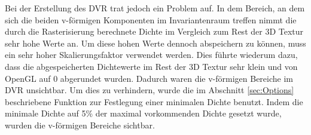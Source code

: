 \documentclass[a4paper,fontsize=12pt,toc=bib,halfparskip]{scrartcl}
\begin{document}
Bei der Erstellung des DVR trat jedoch ein Problem auf. In dem Bereich, an dem sich die beiden v-f\"ormigen Komponenten im Invariantenraum treffen nimmt die durch die Rasterisierung berechnete Dichte im Vergleich zum Rest der 3D Textur sehr hohe Werte an. Um diese hohen Werte dennoch abspeichern zu k\"onnen, muss ein sehr hoher Skalierungsfaktor verwendet werden. Dies f\"uhrte wiederum dazu, dass die abgespeicherten Dichtewerte im Rest der 3D Textur sehr klein und von OpenGL auf 0 abgerundet wurden. Dadurch waren die v-f\"ormigen Bereiche im DVR unsichtbar. Um dies zu verhindern, wurde die im Abschnitt \ref{sec:Options} beschriebene Funktion zur Festlegung einer minimalen Dichte benutzt. Indem die minimale Dichte auf 5\% der maximal vorkommenden Dichte gesetzt wurde, wurden die v-f\"ormigen Bereiche sichtbar.
\end{document}
